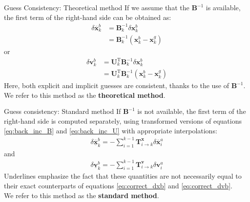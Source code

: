 \documentclass[8pt]{beamer}
\begin{document}
\begin{frame}{Guess Consistency: Theoretical method}
If we assume that the $\mathbf{B}^{-1}$ is available, the first term of the right-hand side can be obtained as:
\begin{align}
\label{eq:correct_dxb}
\delta \overline{\mathbf{x}}^b_k & = \mathbf{B}^{-1}_k \delta \mathbf{x}^b_k \nonumber \\
& = \mathbf{B}^{-1}_k \left(\mathbf{x}^b_k - \mathbf{x}^g_k\right)
\end{align}
or
\begin{align}
\label{eq:correct_dvb}
\delta \mathbf{v}^b_k & = \mathbf{U}_k^\mathrm{T} \mathbf{B}^{-1}_k \delta \mathbf{x}^b_k \nonumber \\
& = \mathbf{U}_k^\mathrm{T} \mathbf{B}^{-1}_k \left(\mathbf{x}^b_k - \mathbf{x}^g_k\right)
\end{align}
Here, both explicit and implicit guesses are consistent, thanks to the use of $\mathbf{B}^{-1}$.\\
\vspace{+0.2cm}
We refer to this method as the \textbf{theoretical method}.
\end{frame}

\begin{frame}{Guess consistency: Standard method}
If $\mathbf{B}^{-1}$ is not available, the first term of the right-hand side is computed separately, using transformed versions of equations \eqref{eq:back_inc_B} and \eqref{eq:back_inc_U} with appropriate interpolations:
\begin{align}
\label{eq:back_inc_Bvar}
\boxed{\delta \underline{\overline{\mathbf{x}}}^b_k = - \sum_{i=1}^{k-1} \mathbf{T}^\mathbf{x}_{i \rightarrow k} \delta \overline{\mathbf{x}}^a_i}
\end{align}
and 
\begin{align}
\label{eq:back_inc_Uvar}
\boxed{\delta \underline{\mathbf{v}}^b_k = - \sum_{i=1}^{k-1} \mathbf{T}^\mathbf{v}_{i \rightarrow k} \delta \mathbf{v}^a_i}
\end{align}
Underlines emphasize the fact that these quantities are not necessarily equal to their exact counterparts of equations \eqref{eq:correct_dxb} and \eqref{eq:correct_dvb}.\\
\vspace{+0.2cm}
We refer to this method as the \textbf{standard method}.
\end{frame}
\end{document}
